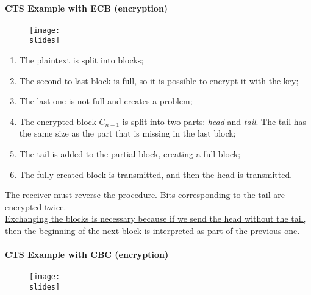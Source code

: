 \paragraph*{CTS Example with ECB (encryption)}
\begin{figure}[h]
    \centering
    \texttt{[image: \\slides]}
\end{figure}
\begin{enumerate}
    \item The plaintext is split into blocks;
    \item The second-to-last block is full, so it is possible to encrypt it with the key;
    \item The last one is not full and creates a problem;
    \item The encrypted block $C_{n-1}$ is split into two parts: \textit{head} and \textit{tail}. The tail has the same size as the part that is missing in the last block;
    \item The tail is added to the partial block, creating a full block;
    \item The fully created block is transmitted, and then the head is transmitted.
\end{enumerate}
The receiver must reverse the procedure. Bits corresponding to the tail are encrypted twice.\\ \ul{Exchanging the blocks is necessary because if we send the head without the tail, then the beginning of the next block is interpreted as part of the previous one.}


\paragraph*{CTS Example with CBC (encryption)}
\begin{figure}[h]
    \centering
    \texttt{[image: \\slides]}
\end{figure}

